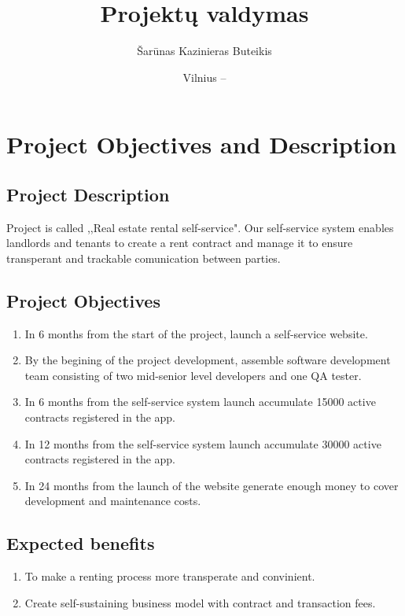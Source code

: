 \documentclass{VUMIFPSkursinis}
\title{Projektų valdymas}
\author{Šarūnas Kazinieras Buteikis}
\date{Vilnius – \the\year}
\begin{document}
\maketitle

\tableofcontents

\section{Project Objectives and Description}
	\subsection{Project Description}
		Project is called ,,Real estate rental self-service". 
		Our self-service system enables landlords and tenants to create a rent contract and manage it to ensure transperant and trackable comunication between parties.

	\subsection{Project Objectives}
		\begin{enumerate}
			\item{In 6 months from the start of the project, launch a self-service website.}
			\item{By the begining of the project development, assemble software development team consisting of two mid-senior level developers and one QA tester.}
			\item{In 6 months from the self-service system launch accumulate 15000 active contracts registered in the app.}
			\item{In 12 months from the self-service system launch accumulate 30000 active contracts registered in the app.}
			\item{In 24 months from the launch of the website generate enough money to cover development and maintenance costs.}
		\end{enumerate}

	\subsection{Expected benefits}
		\begin{enumerate}
			\item{To make a renting process more transperate and convinient.}
			\item{Create self-sustaining business model with contract and transaction fees.}
		\end{enumerate}
\end{document}
